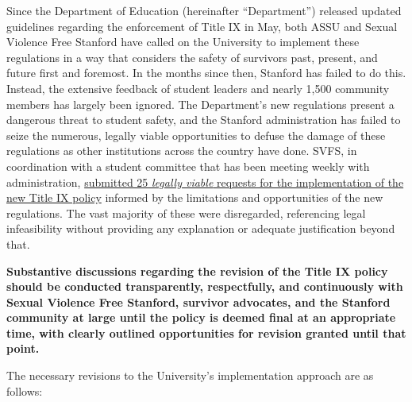 \documentclass[12pt, titlepage, letterpaper]{article}
\begin{document}
Since the Department of Education (hereinafter “Department”) released updated guidelines regarding the enforcement of Title IX in May, both ASSU and Sexual Violence Free Stanford have called on the University to implement these regulations in a way that considers the safety of survivors past, present, and future first and foremost. In the months since then, Stanford has failed to do this. Instead, the extensive feedback of student leaders and nearly 1,500 community members has largely been ignored. The Department’s new regulations present a dangerous threat to student safety, and the Stanford administration has failed to seize the numerous, legally viable opportunities to defuse the damage of these regulations as other institutions across the country have done. SVFS, in coordination with a student committee that has been meeting weekly with administration, \href{https://docs.google.com/document/d/1a6Had9yfTEgL6VGv1V8YzJJ7aedvQAryt-YRbKbRZqI/edit}{submitted 25 \textit{legally viable} requests for the implementation of the new Title IX policy} informed by the limitations and opportunities of the new regulations. The vast majority of these were disregarded, referencing legal infeasibility without providing any explanation or adequate justification beyond that.

\textbf{Substantive discussions regarding the revision of the Title IX policy should be conducted transparently, respectfully, and continuously with Sexual Violence Free Stanford, survivor advocates, and the Stanford community at large until the policy is deemed final at an appropriate time, with clearly outlined opportunities for revision granted until that point.}

The necessary revisions to the University’s implementation approach are as follows:
\end{document}
